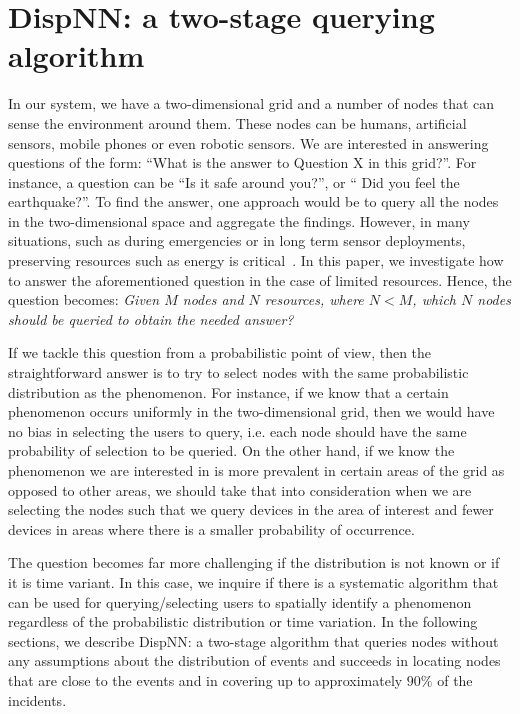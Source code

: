 \documentclass{acm_proc_article-sp}
\begin{document}
\section{D\MakeLowercase{isp}NN: a two-stage querying\\ algorithm}
In our system, we have a two-dimensional grid and a number of nodes that can sense the environment around them. These nodes can be humans, artificial sensors, mobile phones or even robotic sensors. We are interested in answering questions of the form: ``What is the answer to Question X in this grid?''. For instance, a question can be ``Is it safe around you?'', or `` Did you feel the earthquake?''. To find the answer, one approach would be to query all the nodes in the two-dimensional space and aggregate the findings. However, in many situations, such as during emergencies or in long term sensor deployments, preserving resources such as energy is critical~\cite{manoj2007communication}. In this paper, we investigate how to answer the aforementioned question in the case of limited resources. Hence, the question becomes: \textit{Given $M$ nodes and $N$ resources, where $N < M$, which $N$ nodes should be queried to obtain the needed answer?}\par


If we tackle this question from a probabilistic point of view, then the straightforward answer is to try to select nodes with the same probabilistic distribution as the phenomenon. For instance, if we know that a certain phenomenon occurs uniformly in the two-dimensional grid, then we would have no bias in selecting the users to query, i.e. each node should have the same probability of selection to be queried. On the other hand, if we know the phenomenon we are interested in is more prevalent in certain areas of the grid as opposed to other areas, we should take that into consideration when we are selecting the nodes such that we query devices in the area of interest and fewer devices in areas where there is a smaller probability of occurrence.\par

The question becomes far more challenging if the distribution is not known or if it is time variant. In this case, we inquire if there is a systematic algorithm that can be used for querying/selecting users to spatially identify a phenomenon regardless of the probabilistic distribution or time variation. In the following sections, we describe DispNN: a two-stage algorithm that queries nodes without any assumptions about the distribution of events and succeeds in locating nodes that are close to the events and in covering up to approximately $90\%$ of the incidents. \par
\end{document}
